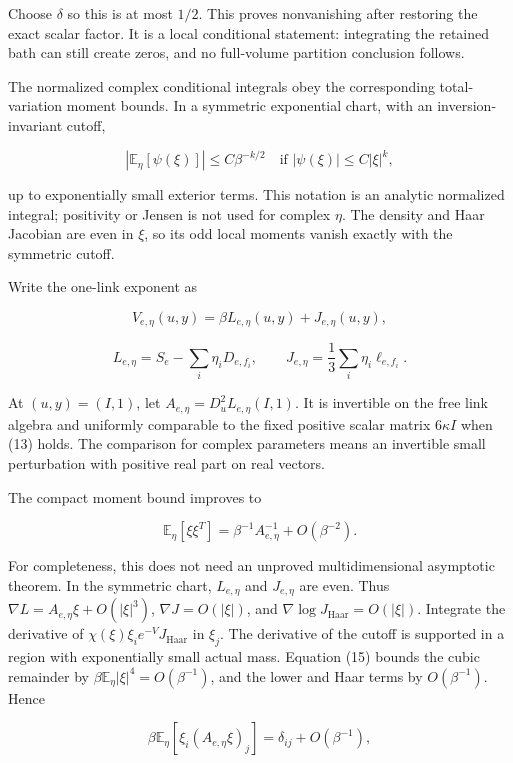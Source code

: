 \documentclass[
  11pt,
]{article}
\begin{document}
Choose \(\delta\) so this is at most \(1/2\). This proves nonvanishing
after restoring the exact scalar factor. It is a local conditional
statement: integrating the retained bath can still create zeros, and no
full-volume partition conclusion follows.

The normalized complex conditional integrals obey the corresponding
total-variation moment bounds. In a symmetric exponential chart, with an
inversion-invariant cutoff,

\[
 |\mathbb E_\eta[\psi(\xi)]|
 \le C\beta^{-k/2}
 \quad\text{if }|\psi(\xi)|\le C|\xi|^k,
                                                        \tag{15}
\]

up to exponentially small exterior terms. This notation is an analytic
normalized integral; positivity or Jensen is not used for complex
\(\eta\). The density and Haar Jacobian are even in \(\xi\), so its odd
local moments vanish exactly with the symmetric cutoff.

Write the one-link exponent as

\[
 V_{e,\eta}(u,y)=\beta L_{e,\eta}(u,y)+J_{e,\eta}(u,y),
\]

\[
 L_{e,\eta}=S_e-\sum_i\eta_iD_{e,f_i},
 \qquad J_{e,\eta}=\frac13\sum_i\eta_i\ell_{e,f_i}.
                                                        \tag{16}
\]

At \((u,y)=(I,1)\), let \(A_{e,\eta}=D_u^2L_{e,\eta}(I,1)\). It is
invertible on the free link algebra and uniformly comparable to the
fixed positive scalar matrix \(6\kappa I\) when (13) holds. The
comparison for complex parameters means an invertible small perturbation
with positive real part on real vectors.

The compact moment bound improves to

\[
 \mathbb E_\eta[\xi\xi^T]
 =\beta^{-1}A_{e,\eta}^{-1}+O(\beta^{-2}).           \tag{17}
\]

For completeness, this does not need an unproved multidimensional
asymptotic theorem. In the symmetric chart, \(L_{e,\eta}\) and
\(J_{e,\eta}\) are even. Thus \(\nabla L=A_{e,\eta}\xi+O(|\xi|^3)\),
\(\nabla J=O(|\xi|)\), and \(\nabla\log J_{\mathrm{Haar}}=O(|\xi|)\).
Integrate the derivative of \(\chi(\xi)\xi_i e^{-V}J_{\mathrm{Haar}}\)
in \(\xi_j\). The derivative of the cutoff is supported in a region with
exponentially small actual mass. Equation (15) bounds the cubic
remainder by \(\beta\mathbb E_\eta|\xi|^4=O(\beta^{-1})\), and the lower
and Haar terms by \(O(\beta^{-1})\). Hence

\[
 \beta\mathbb E_\eta[\xi_i(A_{e,\eta}\xi)_j]
 =\delta_{ij}+O(\beta^{-1}),
\]
\end{document}
